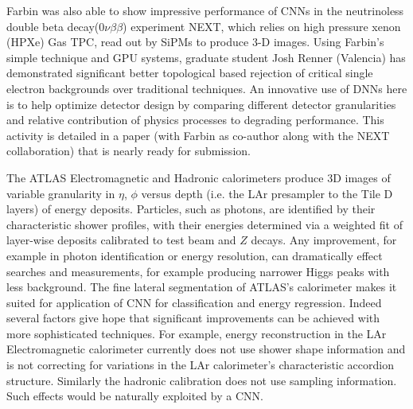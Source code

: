 
Farbin was also able to show impressive performance of CNNs in the
neutrinoless double beta decay($0\nu\beta\beta$) experiment NEXT,
which relies on high pressure xenon (HPXe) Gas TPC, read out by SiPMs
to produce 3-D images. Using Farbin's simple technique and GPU
systems, graduate student Josh Renner (Valencia) has demonstrated
significant better topological based rejection of critical single
electron backgrounds over traditional techniques. An innovative use of
DNNs here is to help optimize detector design by comparing different
detector granularities and relative contribution of physics processes
to degrading performance. This activity is detailed in a paper (with
Farbin as co-author along with the NEXT collaboration) that is nearly
ready for submission.



The ATLAS Electromagnetic and Hadronic calorimeters produce 3D images
of variable granularity in $\eta$, $\phi$ versus depth (i.e. the LAr
presampler to the Tile D layers) of energy deposits. Particles, such
as photons, are identified by their characteristic shower profiles,
with their energies determined via a weighted fit of layer-wise
deposits calibrated to test beam and $Z$ decays. Any improvement, for
example in photon identification or energy resolution, can
dramatically effect searches and measurements, for example producing
narrower Higgs peaks with less background. The fine lateral
segmentation of ATLAS's calorimeter makes it suited for application of
CNN for classification and energy regression. Indeed several factors
give hope that significant improvements can be achieved with more
sophisticated techniques. For example, energy reconstruction in the
LAr Electromagnetic calorimeter currently does not use shower shape
information and is not correcting for variations in the LAr
calorimeter's characteristic accordion structure. Similarly the
hadronic calibration does not use sampling information. Such effects
would be naturally exploited by a CNN.

